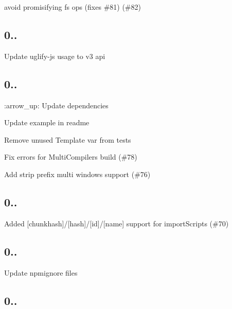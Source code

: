 
\begin{DoxyItemize}
\item avoid promisifying fs ops (fixes \#81) (\#82)
\end{DoxyItemize}

\subsection*{0..}


\begin{DoxyItemize}
\item Update uglify-\/js usage to v3 api
\end{DoxyItemize}

\subsection*{0..}


\begin{DoxyItemize}
\item \+:arrow\+\_\+up\+: Update dependencies
\item Update example in readme
\item Remove unused Template var from tests
\item Fix errors for Multi\+Compilers build (\#78)
\item Add strip prefix multi windows support (\#76)
\end{DoxyItemize}

\subsection*{0..}


\begin{DoxyItemize}
\item Added \mbox{[}chunkhash\mbox{]}/\mbox{[}hash\mbox{]}/\mbox{[}id\mbox{]}/\mbox{[}name\mbox{]} support for import\+Scripts (\#70)
\end{DoxyItemize}

\subsection*{0..}


\begin{DoxyItemize}
\item Update npmignore files
\end{DoxyItemize}

\subsection*{0..}


